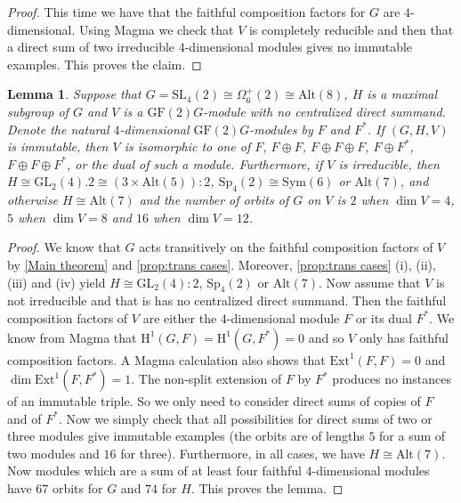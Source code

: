 \documentclass[12pt]{amsart}
\newtheorem{lemma}[theorem]{Lemma}
\theoremstyle{remark}
\theoremstyle{notation}
\theoremstyle{definition}
\newcommand{\GF}{\mathrm{GF}}
\newcommand{\GL}{\mathrm{GL}}
\newcommand{\Sp}{\mathrm{Sp}}
\newcommand{\SL}{\mathrm{SL}}
\newcommand{\0}{\emptyset}
\newcommand{\Sym}{\mathrm{Sym}}
\newcommand{\Alt}{\mathrm{Alt}}
\begin{document}
\begin{proof} This time we have that the faithful composition factors for $G$ are $4$-dimensional. Using {\sc Magma} we check that $V$ is completely reducible and then that a direct sum of two irreducible $4$-dimensional modules gives no immutable examples. This proves the claim.
\end{proof}


\begin{lemma}\label{lem:A8-A7}
Suppose that $G=\SL_4(2)\cong \Omega_6^+(2)\cong \Alt(8)$, $H  $ is a maximal subgroup of $G$ and $V$ is a $\GF(2)G$-module with no centralized direct summand. Denote the natural $4$-dimensional $\GF(2)G$-modules  by  $F$ and $F^*$.    If $(G,H,V)$ is immutable, then $V$ is isomorphic to one of $F$, $ F\oplus F$, $ F\oplus F\oplus F$, $ F\oplus F^*$, $ F\oplus F\oplus F^*$, or the dual of such a module.  Furthermore, if $V$ is irreducible, then $H \cong \GL_2(4).2 \cong (3\times \Alt(5)){:}2$, $\Sp_4(2)\cong \Sym(6)$ or $\Alt(7)$, and otherwise $H\cong\Alt(7)$ and the number of orbits of $G$ on $V$ is $2$ when $\dim V=4$, $5$ when $\dim V= 8$ and $16$ when $\dim V=12$.
\end{lemma}

\begin{proof} We know that $G$ acts  transitively  on the faithful composition factors of $V$ by \cref{Main theorem} and \cref{prop:trans cases}. Moreover, \cref{prop:trans cases} (i), (ii), (iii) and (iv) yield $H \cong \GL_2(4){:}2$, $\Sp_4(2)$ or $\Alt(7)$.
Now assume   that $V$ is not irreducible and that is has no centralized direct summand.
Then the faithful composition factors of $V$ are either the $4$-dimensional module $F$ or its dual $F^*$. We know from {\sc Magma} that $\mathrm H^1(G,F)= \mathrm H^1(G,F^*)=0$ and so $V$ only has faithful composition factors. A {\sc Magma} calculation also shows that $\mathrm{Ext}^1(F,F ) =0$ and $\dim \mathrm{Ext}^1(F,F^*)=1$. The non-split extension of $F$ by $F^*$ produces no instances of an immutable triple. So we only need to consider direct sums of copies of $F$ and of $F^*$. Now we simply check that all possibilities for direct sums of two or three modules give immutable examples (the orbits are of lengths $5$ for a sum of two modules and $16$ for three). Furthermore, in all cases, we have $H \cong \Alt(7)$.
 Now  modules which are a sum of at least four faithful $4$-dimensional modules have $67$ orbits  for $G$ and $74$ for $H$. This proves the lemma.
\end{proof}
\end{document}

